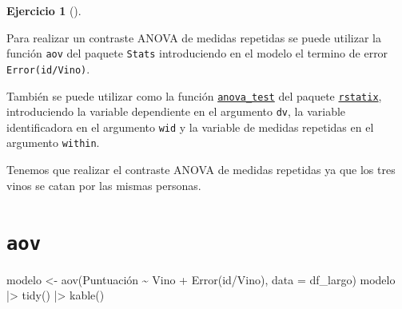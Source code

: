\documentclass[
  a4paper,
]{scrreport}
\newenvironment{Shaded}{\begin{snugshade}}{\end{snugshade}}
\newcommand{\AttributeTok}[1]{\textcolor[rgb]{0.40,0.45,0.13}{#1}}
\newcommand{\FunctionTok}[1]{\textcolor[rgb]{0.28,0.35,0.67}{#1}}
\newcommand{\NormalTok}[1]{\textcolor[rgb]{0.00,0.23,0.31}{#1}}
\newcommand{\OtherTok}[1]{\textcolor[rgb]{0.00,0.23,0.31}{#1}}
\newcommand{\SpecialCharTok}[1]{\textcolor[rgb]{0.37,0.37,0.37}{#1}}
\theoremstyle{definition}
\newtheorem{exercise}{Ejercicio}[chapter]
\theoremstyle{remark}
\begin{document}
\begin{exercise}[]
\begin{enumerate}
  \begin{tcolorbox}[enhanced jigsaw, colframe=quarto-callout-note-color-frame, toprule=.15mm, bottomtitle=1mm, breakable, opacitybacktitle=0.6, toptitle=1mm, colback=white, bottomrule=.15mm, title=\textcolor{quarto-callout-note-color}{\faInfo}\hspace{0.5em}{Ayuda}, arc=.35mm, left=2mm, titlerule=0mm, rightrule=.15mm, coltitle=black, leftrule=.75mm, opacityback=0, colbacktitle=quarto-callout-note-color!10!white]

  Para realizar un contraste ANOVA de medidas repetidas se puede
  utilizar la función \texttt{aov} del paquete \texttt{Stats}
  introduciendo en el modelo el termino de error
  \texttt{Error(id/Vino)}.

  También se puede utilizar como la función
  \href{https://rpkgs.datanovia.com/rstatix/reference/anova_test.html}{\texttt{anova\_test}}
  del paquete
  \href{https://rpkgs.datanovia.com/rstatix/index.html}{\texttt{rstatix}},
  introduciendo la variable dependiente en el argumento \texttt{dv}, la
  variable identificadora en el argumento \texttt{wid} y la variable de
  medidas repetidas en el argumento \texttt{within}.

  \end{tcolorbox}

  \begin{tcolorbox}[enhanced jigsaw, colframe=quarto-callout-tip-color-frame, toprule=.15mm, bottomtitle=1mm, breakable, opacitybacktitle=0.6, toptitle=1mm, colback=white, bottomrule=.15mm, title=\textcolor{quarto-callout-tip-color}{\faLightbulb}\hspace{0.5em}{Solución}, arc=.35mm, left=2mm, titlerule=0mm, rightrule=.15mm, coltitle=black, leftrule=.75mm, opacityback=0, colbacktitle=quarto-callout-tip-color!10!white]

  Tenemos que realizar el contraste ANOVA de medidas repetidas ya que
  los tres vinos se catan por las mismas personas.

  \section{\texorpdfstring{\texttt{aov}}{aov}}

\begin{Shaded}
\begin{Highlighting}[]
\NormalTok{modelo }\OtherTok{\textless{}{-}} \FunctionTok{aov}\NormalTok{(Puntuación }\SpecialCharTok{\textasciitilde{}}\NormalTok{ Vino }\SpecialCharTok{+} \FunctionTok{Error}\NormalTok{(id}\SpecialCharTok{/}\NormalTok{Vino), }\AttributeTok{data =}\NormalTok{ df\_largo) }
\NormalTok{modelo  }\SpecialCharTok{|\textgreater{}}  
    \FunctionTok{tidy}\NormalTok{() }\SpecialCharTok{|\textgreater{}} 
    \FunctionTok{kable}\NormalTok{()}
\end{Highlighting}
\end{Shaded}


\end{tcolorbox}
\end{enumerate}
\end{exercise}
\end{document}
